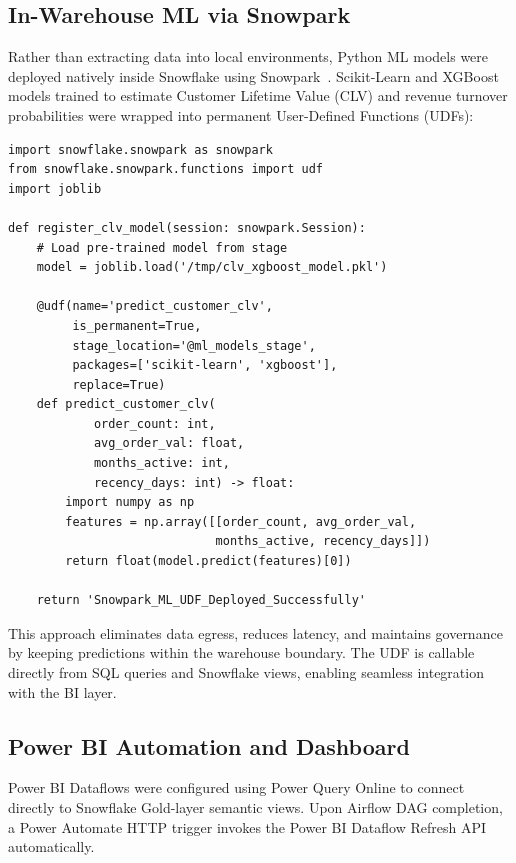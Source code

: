 \documentclass[11pt,a4paper]{article}
\begin{document}
\subsection{In-Warehouse ML via Snowpark}

Rather than extracting data into local environments, Python ML models were deployed natively inside Snowflake using Snowpark~\cite{snowflake2024snowpark}. Scikit-Learn and XGBoost models trained to estimate Customer Lifetime Value (CLV) and revenue turnover probabilities were wrapped into permanent User-Defined Functions (UDFs):

\begin{lstlisting}[caption={Snowpark Python UDF deployment for CLV prediction.}]
import snowflake.snowpark as snowpark
from snowflake.snowpark.functions import udf
import joblib

def register_clv_model(session: snowpark.Session):
    # Load pre-trained model from stage
    model = joblib.load('/tmp/clv_xgboost_model.pkl')

    @udf(name='predict_customer_clv',
         is_permanent=True,
         stage_location='@ml_models_stage',
         packages=['scikit-learn', 'xgboost'],
         replace=True)
    def predict_customer_clv(
            order_count: int,
            avg_order_val: float,
            months_active: int,
            recency_days: int) -> float:
        import numpy as np
        features = np.array([[order_count, avg_order_val,
                             months_active, recency_days]])
        return float(model.predict(features)[0])

    return 'Snowpark_ML_UDF_Deployed_Successfully'
\end{lstlisting}

This approach eliminates data egress, reduces latency, and maintains governance by keeping predictions within the warehouse boundary. The UDF is callable directly from SQL queries and Snowflake views, enabling seamless integration with the BI layer.

\subsection{Power BI Automation and Dashboard}

Power BI Dataflows were configured using Power Query Online to connect directly to Snowflake Gold-layer semantic views. Upon Airflow DAG completion, a Power Automate HTTP trigger invokes the Power BI Dataflow Refresh API automatically.
\end{document}
